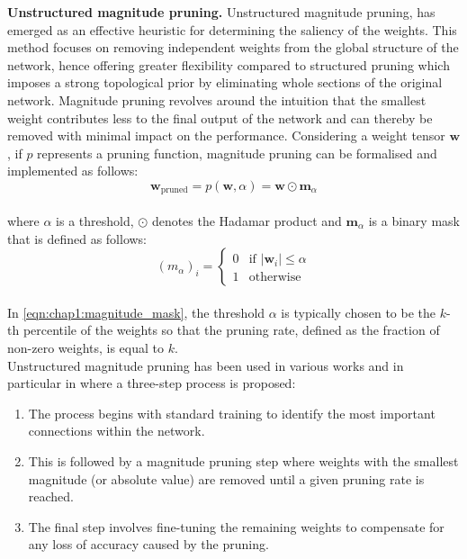 \noindent\textbf{Unstructured magnitude pruning.} Unstructured magnitude
pruning, has emerged as an effective heuristic for determining the saliency of
the weights. This method focuses on removing independent weights from the global
structure of the network, hence offering greater flexibility compared to
structured pruning which imposes a strong topological prior by eliminating whole
sections of the original network. Magnitude pruning revolves around the
intuition that the smallest weight contributes less to the final output of the
network and can thereby be removed with minimal impact on the performance.
Considering a weight tensor $\mathbf{w}$, if $p$ represents a pruning function,
magnitude pruning can be formalised and implemented as follows:\\

\begin{equation}
  \label{eqn:chap1:magnitude_pruning}
  \mathbf{w}_{\text{pruned}} = p(\mathbf{w}, \alpha) = \mathbf{w} \odot \mathbf{m}_\alpha
\end{equation}\\

\noindent where $\alpha$ is a threshold, $\odot$ denotes the Hadamar product and
$\mathbf{m}_\alpha$ is a binary mask that is defined as follows:\\

\begin{equation}
  \label{eqn:chap1:magnitude_mask}
  (m_\alpha)_i = \begin{cases}
  0 & \text{if } |\mathbf{w}_i| \leq \alpha \\
    1 & \text{otherwise}
  \end{cases}
\end{equation}\\

\noindent In \cref{eqn:chap1:magnitude_mask}, the threshold $\alpha$ is
typically chosen to be the $k$-th percentile of the weights so that the pruning
rate, defined as the fraction of non-zero weights, is equal to $k$.\\

Unstructured magnitude pruning has been used in various works and in particular
in \cite{DBLP:conf/nips/HanPTD15} where a three-step process is proposed:\\

\begin{enumerate}
  \item The process begins with standard training to identify the most important
  connections within the network.
  \item This is followed by a magnitude pruning step where weights with the
  smallest magnitude (or absolute value) are removed until a given pruning rate
  is reached.
  \item The final step involves fine-tuning the remaining weights to compensate
  for any loss of accuracy caused by the pruning.\\
\end{enumerate}

